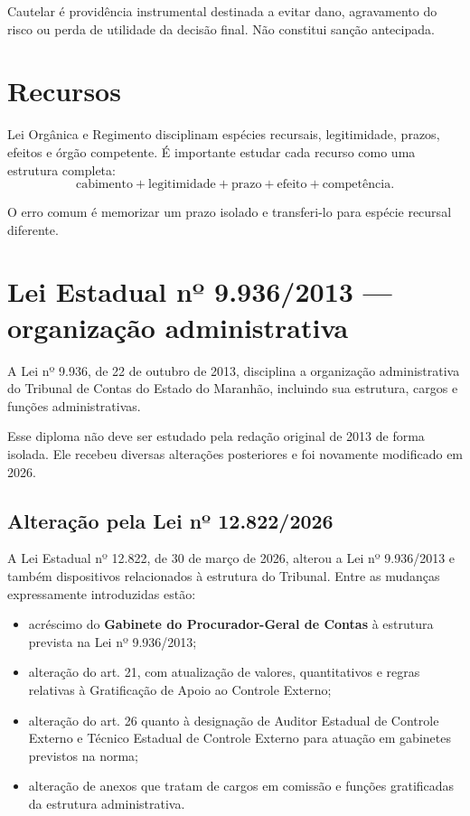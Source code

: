 Cautelar é providência instrumental destinada a evitar dano, agravamento do risco ou perda de utilidade da decisão final. Não constitui sanção antecipada.

\section{Recursos}

Lei Orgânica e Regimento disciplinam espécies recursais, legitimidade, prazos, efeitos e órgão competente. É importante estudar cada recurso como uma estrutura completa:
\[
\text{cabimento} + \text{legitimidade} + \text{prazo} + \text{efeito} + \text{competência}.
\]

O erro comum é memorizar um prazo isolado e transferi-lo para espécie recursal diferente.

\section{Lei Estadual nº 9.936/2013 — organização administrativa}

A Lei nº 9.936, de 22 de outubro de 2013, disciplina a organização administrativa do Tribunal de Contas do Estado do Maranhão, incluindo sua estrutura, cargos e funções administrativas.

Esse diploma não deve ser estudado pela redação original de 2013 de forma isolada. Ele recebeu diversas alterações posteriores e foi novamente modificado em 2026.

\subsection{Alteração pela Lei nº 12.822/2026}

A Lei Estadual nº 12.822, de 30 de março de 2026, alterou a Lei nº 9.936/2013 e também dispositivos relacionados à estrutura do Tribunal. Entre as mudanças expressamente introduzidas estão:
\begin{itemize}
\item acréscimo do \textbf{Gabinete do Procurador-Geral de Contas} à estrutura prevista na Lei nº 9.936/2013;
\item alteração do art. 21, com atualização de valores, quantitativos e regras relativas à Gratificação de Apoio ao Controle Externo;
\item alteração do art. 26 quanto à designação de Auditor Estadual de Controle Externo e Técnico Estadual de Controle Externo para atuação em gabinetes previstos na norma;
\item alteração de anexos que tratam de cargos em comissão e funções gratificadas da estrutura administrativa.
\end{itemize}

